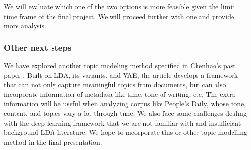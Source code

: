 \documentclass[11pt,a4paper]{article}
\begin{document}
We will evaluate which one of the two options is more feasible given the limit time frame of the final project. We will proceed further with one and provide more analysis. 



\subsubsection{Other next steps}
We have explored another topic modeling method specified in Chenhao's past paper \cite{Card_2018}. Built on LDA, its variants, and VAE, the article develops a framework that can not only capture meaningful topics from documents, but can also incorporate information of metadata like time, tone of writing, etc. The extra information will be useful when analyzing corpus like People's Daily, whose tone, content, and topics vary a lot through time. We also face some challenges dealing with the deep learning framework that we are not familiar with and insufficient background LDA literature. We hope to incorporate this or other topic modelling method in the final presentation. 





\end{document}
